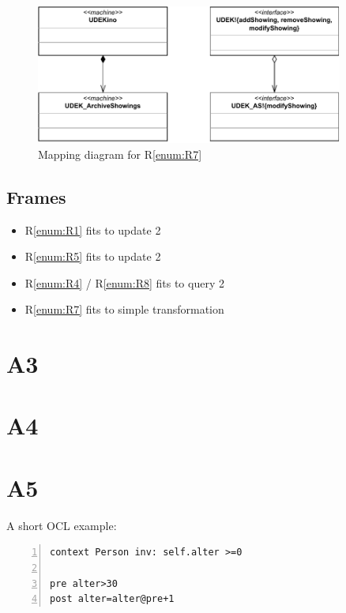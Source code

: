 \documentclass[a4paper,10pt,titlepage,bibtotoc,bibtotocnumbered]{scrreprt}
\begin{document}
\begin{figure}[H]
\centering
\includegraphics[width=0.9\textwidth]{figures/04/a04_problem_diagram_4-Mapping.pdf}
\caption{Mapping diagram for R\ref{enum:R7}}
\label{figure:mdR7}
\end{figure}

\subsection*{Frames}
\begin{itemize}
    \item R\ref{enum:R1} fits to update 2
    \item R\ref{enum:R5} fits to update 2
    \item R\ref{enum:R4} / R\ref{enum:R8} fits to query 2
    \item R\ref{enum:R7} fits to simple transformation
\end{itemize}

\newpage\section{A3}

\newpage\section{A4}

\newpage\section{A5}
A short OCL example:\\
\lstset{language=OCL}          %

\begin{lstlisting}[frame=single,breaklines=true,numbers=left,numberfirstline=true]
context Person inv: self.alter >=0

pre alter>30
post alter=alter@pre+1

\end{lstlisting}
\end{document}

